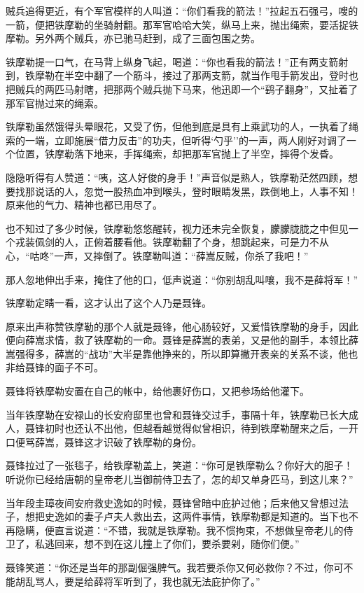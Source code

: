 \documentclass[12pt,oneside]{book}
\begin{document}
贼兵追得更近，有个军官模样的人叫道：``你们看我的箭法！''拉起五石强弓，嗖的一箭，便把铁摩勒的坐骑射翻。那军官哈哈大笑，纵马上来，抛出绳索，要活捉铁摩勒。另外两个贼兵，亦已驰马赶到，成了三面包围之势。

铁摩勒提一口气，在马背上纵身飞起，喝道：``你也看我的箭法！''正有两支箭射到，铁摩勒在半空中翻了一个筋斗，接过了那两支箭，就当作甩手箭发出，登时也把贼兵的两匹马射瞎，把那两个贼兵抛下马来，他迅即一个``鹞子翻身''，又扯着了那军官抛过来的绳索。

铁摩勒虽然饿得头晕眼花，又受了伤，但他到底是具有上乘武功的人，一执着了绳索的一端，立即施展``借力反击''的功夫，但听得`勺乎''的一声，两人刚好对调了一个位置，铁摩勒落下地来，手挥绳索，却把那军官抛上了半空，摔得个发昏。

隐隐听得有人赞道：``咦，这人好俊的身手！''声音似是熟人，铁摩勒茫然四顾，想要找那说话的人，忽觉一股热血冲到喉头，登时眼睛发黑，跌倒地上，人事不知！原来他的气力、精神也都已用尽了。

也不知过了多少时候，铁摩勒悠悠醒转，视力还未完全恢复，朦朦胧胧之中但见一个戎装佩剑的人，正俯着腰看他。铁摩勒翻了个身，想跳起来，可是力不从心，``咕咚''一声，又摔倒了。铁摩勒叫道：``薛嵩反贼，你杀了我吧！''

那人忽地伸出手来，掩住了他的口，低声说道：``你别胡乱叫嚷，我不是薛将军！''

铁摩勒定睛一看，这才认出了这个人乃是聂锋。

原来出声称赞铁摩勒的那个人就是聂锋，他心肠较好，又爱惜铁摩勒的身手，因此便向薛嵩求情，救了铁摩勒的一命。聂锋是薛嵩的表弟，又是他的副手，本领比薛嵩强得多，薛嵩的``战功''大半是靠他挣来的，所以即算撇开表亲的关系不谈，他也非给聂锋的面子不可。

聂锋将铁摩勒安置在自己的帐中，给他裹好伤口，又把参场给他灌下。

当年铁摩勒在安禄山的长安府邸里也曾和聂锋交过手，事隔十年，铁摩勒已长大成人，聂锋初时也还认不出他，但越看越觉得似曾相识，待到铁摩勒醒来之后，一开口便骂薛嵩，聂锋这才识破了铁摩勒的身份。

聂锋拉过了一张毯子，给铁摩勒盖上，笑道：``你可是铁摩勒么？你好大的胆子！听说你已经给唐朝的皇帝老儿当御前侍卫去了，怎的却又单身匹马，到这儿来？''

当年段圭璋夜间安府救史逸如的时候，聂锋曾暗中庇护过他；后来他又曾想过法子，想把史逸如的妻子卢夫人救出去，这两件事情，铁摩勒都是知道的。当下也不再隐瞒，便直言说道：``不错，我就是铁摩勒。我不惯拘束，不想做皇帝老儿的侍卫了，私逃回来，想不到在这儿撞上了你们，要杀要剁，随你们便。''

聂锋笑道：``你还是当年的那副倔强脾气。我若要杀你又何必救你？不过，你可不能胡乱骂人，要是给薛将军听到了，我也就无法庇护你了。''
\end{document}
